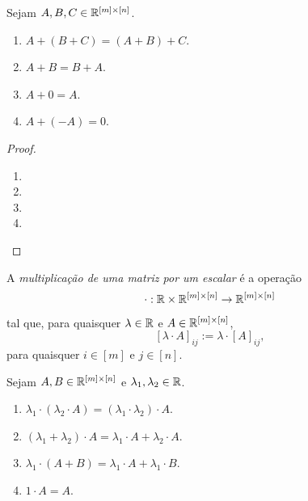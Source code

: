 \begin{proposition}
    Sejam $A,B,C \in \mathbb{R}^{[m] \times [n]}$.
        \begin{enumerate}[leftmargin=*, align=left, label=\textbf{(\alph*)}]
            \item $A + (B + C) = (A + B) + C$.
            \item $A+B=B+A$.
            \item $A + 0 = A$.
            \item $A + (-A) = 0$.
        \end{enumerate}
\end{proposition}

\begin{proof}
    \leavevmode
        \begin{enumerate}[leftmargin=*, align=left, label=\textbf{(\alph*)}]
            \item
            \item
            \item
            \item 
        \end{enumerate}
\end{proof}

\begin{definition}
    A \emph{multiplicação de uma matriz por um escalar} é a operação
        \[
            \cdot : \mathbb{R} \times \mathbb{R}^{[m] \times [n]} \to \mathbb{R}^{[m] \times [n]}
        \]
    tal que, para quaisquer $\lambda \in \mathbb{R}$ e $A \in \mathbb{R}^{[m] \times [n]}$,
        \[
            [\lambda \cdot A]_{ij} := \lambda \cdot [A]_{ij},
        \]
    para quaisquer $i \in [m]$ e $j \in [n]$.
\end{definition}

\begin{proposition}
    Sejam $A,B \in \mathbb{R}^{[m] \times [n]}$ e $\lambda_1, \lambda_2 \in \mathbb{R}$.
        \begin{enumerate}[leftmargin=*, align=left, label=\textbf{(\alph*)}]
            \item $\lambda_1 \cdot (\lambda_2 \cdot A) = (\lambda_1 \cdot \lambda_2) \cdot A$.
            \item $(\lambda_1 + \lambda_2) \cdot A = \lambda_1 \cdot A + \lambda_2 \cdot A$.
            \item $\lambda_1 \cdot (A + B) = \lambda_1 \cdot A + \lambda_1 \cdot B$.
            \item $1 \cdot A = A$.
        \end{enumerate}
\end{proposition}

